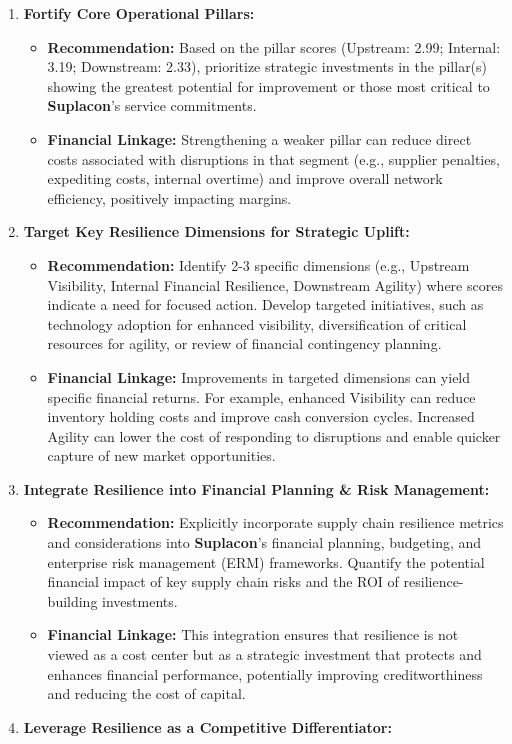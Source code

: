 \documentclass[
  oneside,
  open=any,
  fontsize=11pt]{scrbook}
\providecommand{\tightlist}{%
  \setlength{\itemsep}{0pt}\setlength{\parskip}{0pt}}
\begin{document}
\begin{enumerate}
\def\labelenumi{\arabic{enumi}.}
\tightlist
\item
  \textbf{Fortify Core Operational Pillars:}

  \begin{itemize}
  \tightlist
  \item
    \textbf{Recommendation:} Based on the pillar scores (Upstream: 2.99;
    Internal: 3.19; Downstream: 2.33), prioritize strategic investments
    in the pillar(s) showing the greatest potential for improvement or
    those most critical to \textbf{Suplacon}'s service commitments.
  \item
    \textbf{Financial Linkage:} Strengthening a weaker pillar can reduce
    direct costs associated with disruptions in that segment (e.g.,
    supplier penalties, expediting costs, internal overtime) and improve
    overall network efficiency, positively impacting margins.
  \end{itemize}
\item
  \textbf{Target Key Resilience Dimensions for Strategic Uplift:}

  \begin{itemize}
  \tightlist
  \item
    \textbf{Recommendation:} Identify 2-3 specific dimensions (e.g.,
    Upstream Visibility, Internal Financial Resilience, Downstream
    Agility) where scores indicate a need for focused action. Develop
    targeted initiatives, such as technology adoption for enhanced
    visibility, diversification of critical resources for agility, or
    review of financial contingency planning.
  \item
    \textbf{Financial Linkage:} Improvements in targeted dimensions can
    yield specific financial returns. For example, enhanced Visibility
    can reduce inventory holding costs and improve cash conversion
    cycles. Increased Agility can lower the cost of responding to
    disruptions and enable quicker capture of new market opportunities.
  \end{itemize}
\item
  \textbf{Integrate Resilience into Financial Planning \& Risk
  Management:}

  \begin{itemize}
  \tightlist
  \item
    \textbf{Recommendation:} Explicitly incorporate supply chain
    resilience metrics and considerations into \textbf{Suplacon}'s
    financial planning, budgeting, and enterprise risk management (ERM)
    frameworks. Quantify the potential financial impact of key supply
    chain risks and the ROI of resilience-building investments.
  \item
    \textbf{Financial Linkage:} This integration ensures that resilience
    is not viewed as a cost center but as a strategic investment that
    protects and enhances financial performance, potentially improving
    creditworthiness and reducing the cost of capital.
  \end{itemize}
\item
  \textbf{Leverage Resilience as a Competitive Differentiator:}


\end{enumerate}
\end{document}
